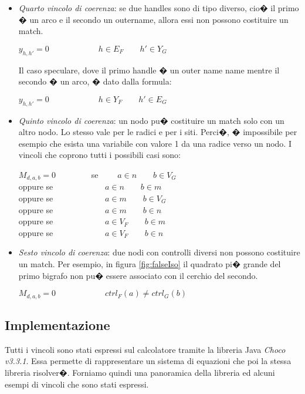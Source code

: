 \begin{itemize}
	\item
	\emph{Quarto vincolo di coerenza}: se due handles sono di tipo diverso, cio� il primo � un arco e il secondo un outername, allora essi non possono costituire un match.
		\begin{center}
		$y_{h,h'} = 0 \qquad \qquad \qquad h \in E_F \qquad h' \in Y_G \qquad $ \\ 
		\end{center}
		Il caso speculare, dove il primo handle � un outer name name mentre il secondo � un arco, � dato dalla formula:
		\begin{center}
		$y_{h,h'} = 0 \qquad \qquad \qquad h \in Y_F \qquad h' \in E_G \qquad $ \\ 
		\end{center}
	
	\item
	\emph{Quinto vincolo di coerenza}: un nodo pu� costituire un match solo con un altro nodo. Lo stesso vale per le radici e per i siti. Perci�, � impossibile per esempio che esista una variabile con valore 1 da una radice verso un nodo. I vincoli che coprono tutti i possibili casi sono:
		\begin{center}
		$M_{d,a,b} = 0 \qquad \qquad$ se $ \qquad a \in n \qquad b \in V_G $\\
		oppure se $ \qquad \qquad \qquad a \in n \qquad b \in m $\\
		oppure se $ \qquad \qquad \qquad a \in m \qquad b \in V_G $\\
		oppure se $ \qquad \qquad \qquad a \in m \qquad b \in n $\\
		oppure se $ \qquad \qquad \qquad a \in V_F \qquad b \in m $\\
		oppure se $ \qquad \qquad \qquad a \in V_F \qquad b \in n $\\
		\end{center}
	\item
	\emph{Sesto vincolo di coerenza}: due nodi con controlli diversi non possono costituire un match. Per esempio, in figura \ref{fig:falseIso} il quadrato pi� grande del primo bigrafo non pu� essere associato con il cerchio del secondo.
	\begin{center}
	$M_{d,a,b} = 0 \qquad \qquad \qquad ctrl_F(a) \ne ctrl_G(b)$
	\end{center}
	
\end{itemize}

\subsection{Implementazione}
Tutti i vincoli sono stati espressi sul calcolatore tramite la libreria Java \emph{Choco v3.3.1}. Essa permette di rappresentare un sistema di equazioni che poi la stessa libreria risolver�. Forniamo quindi una panoramica della libreria ed alcuni esempi di vincoli che sono stati espressi.

